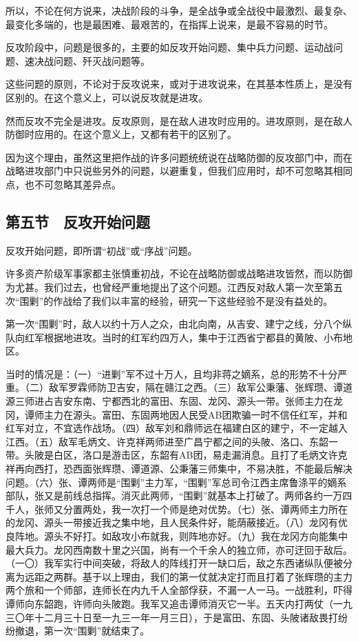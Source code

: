 所以，不论在何方说来，决战阶段的斗争，是全战争或全战役中最激烈、最复杂、最变化多端的，也是最困难、最艰苦的，在指挥上说来，是最不容易的时节。

反攻阶段中，问题是很多的，主要的如反攻开始问题、集中兵力问题、运动战问题、速决战问题、歼灭战问题等。

这些问题的原则，不论对于反攻说来，或对于进攻说来，在其基本性质上，是没有区别的。在这个意义上，可以说反攻就是进攻。

然而反攻不完全是进攻。反攻原则，是在敌人进攻时应用的。进攻原则，是在敌人防御时应用的。在这个意义上，又都有若干的区别了。

因为这个理由，虽然这里把作战的许多问题统统说在战略防御的反攻部门中，而在战略进攻部门中只说些另外的问题，以避重复，但我们应用时，却不可忽略其相同点，也不可忽略其差异点。

\subsection{第五节　反攻开始问题}

反攻开始问题，即所谓“初战”或“序战”问题。

许多资产阶级军事家都主张慎重初战，不论在战略防御或战略进攻皆然，而以防御为尤甚。我们过去，也曾经严重地提出了这个问题。江西反对敌人第一次至第五次“围剿”的作战给了我们以丰富的经验，研究一下这些经验不是没有益处的。

第一次“围剿”时，敌人以约十万人之众，由北向南，从吉安、建宁之线，分八个纵队向红军根据地进攻。当时的红军约四万人，集中于江西省宁都县的黄陂、小布地区。

当时的情况是：（一）“进剿”军不过十万人，且均非蒋之嫡系，总的形势不十分严重。（二）敌军罗霖师防卫吉安，隔在赣江之西。（三）敌军公秉藩、张辉瓒、谭道源三师进占吉安东南、宁都西北的富田、东固、龙冈、源头一带。张师主力在龙冈，谭师主力在源头。富田、东固两地因人民受AB团欺骗一时不信任红军，并和红军对立，不宜选作战场。（四）敌军刘和鼎师远在福建白区的建宁，不一定越入江西。（五）敌军毛炳文、许克祥两师进至广昌宁都之间的头陂、洛口、东韶一带。头陂是白区，洛口是游击区，东韶有AB团，易走漏消息。且打了毛炳文许克祥再向西打，恐西面张辉瓒、谭道源、公秉藩三师集中，不易决胜，不能最后解决问题。（六）张、谭两师是“围剿”主力军，“围剿”军总司令江西主席鲁涤平的嫡系部队，张又是前线总指挥。消灭此两师，“围剿”就基本上打破了。两师各约一万四千人，张师又分置两处，我一次打一个师是绝对优势。（七）张、谭两师主力所在的龙冈、源头一带接近我之集中地，且人民条件好，能荫蔽接近。（八）龙冈有优良阵地。源头不好打。如敌攻小布就我，则阵地亦好。（九）我在龙冈方向能集中最大兵力。龙冈西南数十里之兴国，尚有一个千余人的独立师，亦可迂回于敌后。（一〇）我军实行中间突破，将敌人的阵线打开一缺口后，敌之东西诸纵队便被分离为远距之两群。基于以上理由，我们的第一仗就决定打而且打着了张辉瓒的主力两个旅和一个师部，连师长在内九千人全部俘获，不漏一人一马。一战胜利，吓得谭师向东韶跑，许师向头陂跑。我军又追击谭师消灭它一半。五天内打两仗（一九三〇年十二月三十日至一九三一年一月三日），于是富田、东固、头陂诸敌畏打纷纷撤退，第一次“围剿”就结束了。

